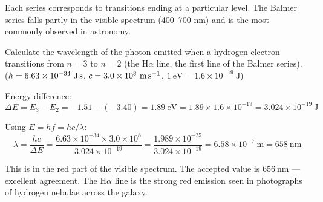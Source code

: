 \begin{diagbox}
\begin{center}
\end{center}
\small Each series corresponds to transitions ending
at a particular level. The Balmer series falls partly
in the visible spectrum (400--700 nm) and is the most
commonly observed in astronomy.
\end{diagbox}

\begin{examplebox}[27.1]
Calculate the wavelength of the photon emitted when
a hydrogen electron transitions from $n = 3$ to
$n = 2$ (the H$\alpha$ line, the first line of the
Balmer series).\\
($h = 6.63\times10^{-34}\ \text{J\,s}$,
$c = 3.0\times10^8\ \text{m\,s}^{-1}$,
$1\ \text{eV} = 1.6\times10^{-19}\ \text{J}$)
\end{examplebox}

\begin{solutionbox}
Energy difference:
\[
  \Delta E = E_3 - E_2 = -1.51 - (-3.40)
  = 1.89\ \text{eV}
  = 1.89 \times 1.6\times10^{-19}
  = 3.024\times10^{-19}\ \text{J}
\]

Using $E = hf = hc/\lambda$:
\[
  \lambda = \frac{hc}{\Delta E}
  = \frac{6.63\times10^{-34} \times 3.0\times10^8}
    {3.024\times10^{-19}}
  = \frac{1.989\times10^{-25}}{3.024\times10^{-19}}
  = 6.58\times10^{-7}\ \text{m}
  = 658\ \text{nm}
\]

This is in the red part of the visible spectrum.
The accepted value is $656\ \text{nm}$ ---
excellent agreement. The H$\alpha$ line is the
strong red emission seen in photographs of hydrogen
nebulae across the galaxy.
\end{solutionbox}

